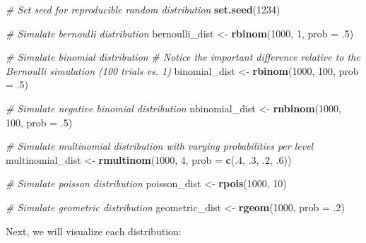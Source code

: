 \documentclass[]{book}
\newenvironment{Shaded}{\begin{snugshade}}{\end{snugshade}}
\newcommand{\CommentTok}[1]{\textcolor[rgb]{0.56,0.35,0.01}{\textit{#1}}}
\newcommand{\DataTypeTok}[1]{\textcolor[rgb]{0.13,0.29,0.53}{#1}}
\newcommand{\DecValTok}[1]{\textcolor[rgb]{0.00,0.00,0.81}{#1}}
\newcommand{\FloatTok}[1]{\textcolor[rgb]{0.00,0.00,0.81}{#1}}
\newcommand{\KeywordTok}[1]{\textcolor[rgb]{0.13,0.29,0.53}{\textbf{#1}}}
\newcommand{\NormalTok}[1]{#1}
\newcommand{\StringTok}[1]{\textcolor[rgb]{0.31,0.60,0.02}{#1}}
\begin{document}
\begin{Shaded}
\begin{Highlighting}[]
\CommentTok{# Set seed for reproducible random distribution}
\KeywordTok{set.seed}\NormalTok{(}\DecValTok{1234}\NormalTok{)}

\CommentTok{# Simulate bernoulli distribution}
\NormalTok{bernoulli_dist <-}\StringTok{ }\KeywordTok{rbinom}\NormalTok{(}\DecValTok{1000}\NormalTok{, }\DecValTok{1}\NormalTok{, }\DataTypeTok{prob =} \FloatTok{.5}\NormalTok{)}

\CommentTok{# Simulate binomial distribution}
\CommentTok{# Notice the important difference relative to the Bernoulli simulation (100 trials vs. 1)}
\NormalTok{binomial_dist <-}\StringTok{ }\KeywordTok{rbinom}\NormalTok{(}\DecValTok{1000}\NormalTok{, }\DecValTok{100}\NormalTok{, }\DataTypeTok{prob =} \FloatTok{.5}\NormalTok{) }

\CommentTok{# Simulate negative binomial distribution}
\NormalTok{nbinomial_dist <-}\StringTok{ }\KeywordTok{rnbinom}\NormalTok{(}\DecValTok{1000}\NormalTok{, }\DecValTok{100}\NormalTok{, }\DataTypeTok{prob =} \FloatTok{.5}\NormalTok{) }

\CommentTok{# Simulate multinomial distribution with varying probabilities per level}
\NormalTok{multinomial_dist <-}\StringTok{ }\KeywordTok{rmultinom}\NormalTok{(}\DecValTok{1000}\NormalTok{, }\DecValTok{4}\NormalTok{, }\DataTypeTok{prob =} \KeywordTok{c}\NormalTok{(.}\DecValTok{4}\NormalTok{, }\FloatTok{.3}\NormalTok{, }\FloatTok{.2}\NormalTok{, }\FloatTok{.6}\NormalTok{))}

\CommentTok{# Simulate poisson distribution}
\NormalTok{poisson_dist <-}\StringTok{ }\KeywordTok{rpois}\NormalTok{(}\DecValTok{1000}\NormalTok{, }\DecValTok{10}\NormalTok{) }

\CommentTok{# Simulate geometric distribution}
\NormalTok{geometric_dist <-}\StringTok{ }\KeywordTok{rgeom}\NormalTok{(}\DecValTok{1000}\NormalTok{, }\DataTypeTok{prob =} \FloatTok{.2}\NormalTok{) }
\end{Highlighting}
\end{Shaded}

Next, we will visualize each distribution:
\end{document}
